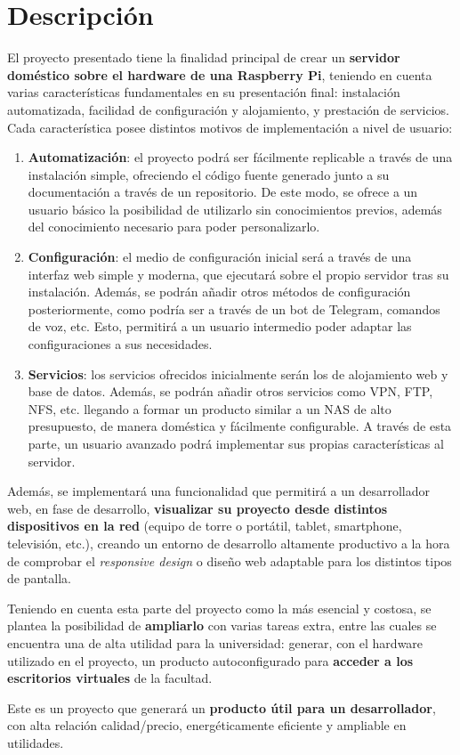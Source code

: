 \section{Descripción} \label{chapters:descripcion:sections:descripcion}

El proyecto presentado tiene la finalidad principal de crear un \textbf{servidor doméstico sobre el hardware de una Raspberry Pi}, teniendo en cuenta varias características fundamentales en su presentación final: instalación automatizada, facilidad de configuración y alojamiento, y prestación de servicios. Cada característica posee distintos motivos de implementación a nivel de usuario:

\begin{enumerate}
    \item \textbf{Automatización}: el proyecto podrá ser fácilmente replicable a través de una instalación simple, ofreciendo el código fuente generado junto a su documentación a través de un repositorio. De este modo, se ofrece a un usuario básico la posibilidad de utilizarlo sin conocimientos previos, además del conocimiento necesario para poder personalizarlo.
    \item \textbf{Configuración}: el medio de configuración inicial será a través de una interfaz web simple y moderna, que ejecutará sobre el propio servidor tras su instalación. Además, se podrán añadir otros métodos de configuración posteriormente, como podría ser a través de un bot de Telegram, comandos de voz, etc. Esto, permitirá a un usuario intermedio poder adaptar las configuraciones a sus necesidades.
    \item \textbf{Servicios}: los servicios ofrecidos inicialmente serán los de alojamiento web y base de datos. Además, se podrán añadir otros servicios como VPN, FTP, NFS, etc. llegando a formar un producto similar a un NAS de alto presupuesto, de manera doméstica y fácilmente configurable. A través de esta parte, un usuario avanzado podrá implementar sus propias características al servidor.
\end{enumerate}

Además, se implementará una funcionalidad que permitirá a un desarrollador web, en fase de desarrollo, \textbf{visualizar su proyecto desde distintos dispositivos en la red} (equipo de torre o portátil, tablet, smartphone, televisión, etc.), creando un entorno de desarrollo altamente productivo a la hora de comprobar el \textit{responsive design} o diseño web adaptable para los distintos tipos de pantalla.

Teniendo en cuenta esta parte del proyecto como la más esencial y costosa, se plantea la posibilidad de \textbf{ampliarlo} con varias tareas extra, entre las cuales se encuentra una de alta utilidad para la universidad: generar, con el hardware utilizado en el proyecto, un producto autoconfigurado para \textbf{acceder a los escritorios virtuales} de la facultad.

Este es un proyecto que generará un \textbf{producto útil para un desarrollador}, con alta relación calidad/precio, energéticamente eficiente y ampliable en utilidades.

\clearpage
